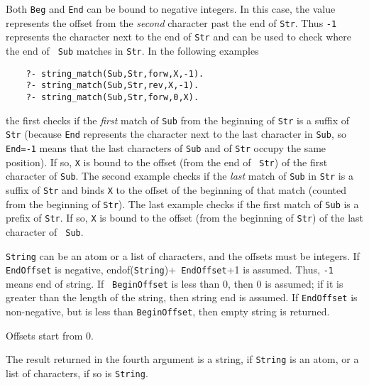 \begin{description}
Both {\tt Beg} and {\tt End} can be bound to negative integers.
In this case, the value represents the offset from the \emph{second}
character past the end of {\tt Str}. Thus {\tt -1} represents the character
next to the end of {\tt Str} and can be used to check where the end of {\tt
  Sub}  matches in {\tt Str}. In the following examples
\begin{verbatim}
    ?- string_match(Sub,Str,forw,X,-1).  
    ?- string_match(Sub,Str,rev,X,-1).  
    ?- string_match(Sub,Str,forw,0,X).  
\end{verbatim}
the first checks if the \emph{first} match of {\tt Sub} from the beginning
of {\tt Str} is a suffix of {\tt Str} (because {\tt End} represents the
character next to the last character in {\tt Sub}, so {\tt End=-1} means
that the last characters of {\tt Sub} and of {\tt Str} occupy the same
position). If so, {\tt X} is bound to the offset (from the end of {\tt
  Str}) of the first character of {\tt Sub}. The second example checks if
the \emph{last} match of {\tt Sub} in {\tt Str} is a suffix of {\tt Str}
and binds {\tt X} to the offset of the beginning of that match (counted
from the beginning of {\tt Str}).  The last example checks if the first
match of {\tt Sub} is a prefix of {\tt Str}. If so, {\tt X} is bound to the
offset (from the beginning of {\tt Str}) of the last character of {\tt
  Sub}.



{\tt String} can be an atom or a list of characters, and the offsets must
be integers.  If {\tt EndOffset} is negative, endof({\tt String})+{\tt
  EndOffset}+1 is assumed. Thus, {\tt -1} means end of string.  If {\tt
  BeginOffset} is less than 0, then 0 is assumed; if it is greater than the
length of the string, then string end is assumed. If {\tt EndOffset} is
non-negative, but is less than {\tt BeginOffset}, then empty string is
returned.

Offsets start from 0.

The result returned in the fourth argument is a string, if {\tt String} is
an atom, or a list of characters, if so is {\tt String}.


\end{description}
